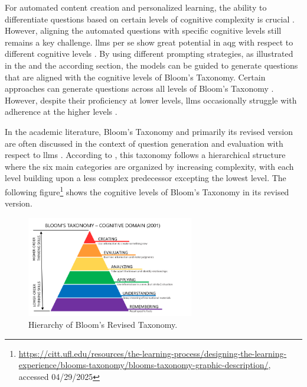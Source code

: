  For automated content creation and personalized learning, the ability to differentiate questions based on certain levels of cognitive complexity is crucial \cite{li_planning_2024,zhuge_twinstar_2025}. However, aligning the automated questions with specific cognitive levels still remains a key challenge. \ac{llms} per se show great potential in \ac{aqg} with respect to different cognitive levels \cite{maity_can_2025,blobstein_angel_2023,duong-trung_bloomllm_2024,scaria_automated_2024,scaria_how_2024}. By using different prompting strategies, as illustrated in the  and the according  section, the models can be guided to generate questions that are aligned with the cognitive levels of Bloom's Taxonomy. Certain approaches can generate questions across all levels of Bloom's Taxonomy \cite{duong-trung_bloomllm_2024,zhuge_twinstar_2025}. However, despite their proficiency at lower levels, \ac{llms} occasionally struggle with adherence at the higher levels \cite{duong-trung_bloomllm_2024,cheng_treequestion_2024,elkins_how_2023}.

 In the academic literature, Bloom's Taxonomy \cite{krathwohl_taxonomy_1964} and primarily its revised version \cite{krathwohl_revision_2002} are often discussed in the context of question generation and evaluation with respect to \ac{llms} \cite{zhuge_twinstar_2025,scaria_automated_2024,scaria_how_2024,elkins_how_2023}.
According to \cite{krathwohl_revision_2002}, this taxonomy follows a hierarchical structure where the six main categories are organized by increasing complexity, with each level building upon a less complex predecessor excepting the lowest level. The following figure\footnote{\url{https://citt.ufl.edu/resources/the-learning-process/designing-the-learning-experience/blooms-taxonomy/blooms-taxonomy-graphic-description/}, accessed 04/29/2025} shows the cognitive levels of Bloom's Taxonomy in its revised version.

\begin{figure}[htbp]
   \vspace{-.5em}
   \centering
   \includegraphics[width=0.65\textwidth]{../extra/Blooms-Taxonomy.png}
   \caption{Hierarchy of Bloom's Revised Taxonomy.}
\end{figure}

